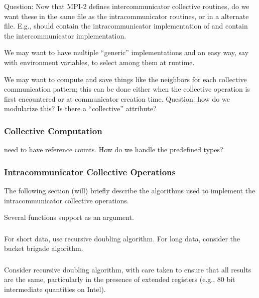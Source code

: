 \documentclass{article}
\begin{document}
Question: Now that MPI-2 defines intercommunicator collective
routines, do we want these in the same file as the intracommunicator
routines, or in a alternate file.  E.g., should  contain
the intracommunicator implementation of  and
 contain the intercommunicator implementation.

We may want to have multiple ``generic'' implementations and an easy
way, say with environment variables, to select among them at runtime.

We may want to compute and save things like the neighbors for each
collective communication pattern; this can be done either when the
collective operation is first encountered or at communicator creation
time.  Question: how do we modularize this?  Is there a ``collective''
attribute?

\subsubsection{Collective Computation}
 need to have reference counts.  How do we handle the
predefined types?  
\subsubsection{}
\subsubsection{}


\subsubsection{Intracommunicator Collective Operations}
The following section (will) briefly describe the algorithms used to implement
the intracommunicator collective operations.

Several functions support  as an argument.

\subsubsection{}
For short data, use recursive doubling algorithm.  For long data, consider the
bucket brigade algorithm.

\subsubsection{}
Consider recursive doubling algorithm, with care taken to ensure that all
results are the same, particularly in the presence of extended registers
(e.g., 80 bit intermediate quantities on Intel).
\end{document}

